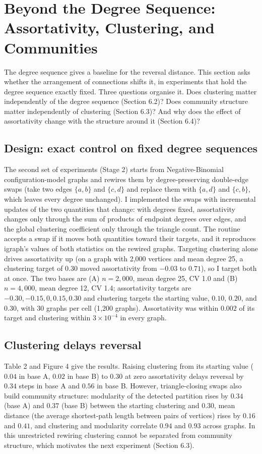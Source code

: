 \documentclass{nws}
\begin{document}
\section{Beyond the Degree Sequence: Assortativity, Clustering, and Communities}

The degree sequence gives a baseline for the reversal distance. This section asks whether the arrangement of connections shifts it, in experiments that hold the degree sequence exactly fixed. Three questions organise it. Does clustering matter independently of the degree sequence (Section 6.2)? Does community structure matter independently of clustering (Section 6.3)? And why does the effect of assortativity change with the structure around it (Section 6.4)?

\subsection{Design: exact control on fixed degree sequences}

The second set of experiments (Stage 2) starts from Negative-Binomial configuration-model graphs and rewires them
by degree-preserving double-edge swaps (take two edges $\{a,b\}$ and $\{c,d\}$ and replace them with $\{a,d\}$ and $\{c,b\}$, which leaves every degree unchanged). I implemented the swaps with incremental
updates of the two quantities that change: with degrees fixed, assortativity changes
only through the sum of products of endpoint degrees over edges, and the global
clustering coefficient only through the triangle count. The routine accepts a swap if
it moves both quantities toward their targets, and it reproduces igraph's values of
both statistics on the rewired graphs. Targeting clustering alone drives
assortativity up (on a graph with 2{,}000 vertices and mean degree 25, a clustering
target of 0.30 moved assortativity from $-0.03$ to $0.71$), so I target both at once.
The two bases are (A) $n=2{,}000$, mean degree 25, CV 1.0 and (B) $n=4{,}000$, mean
degree 12, CV 1.4; assortativity targets are $-0.30,-0.15,0,0.15,0.30$ and clustering
targets the starting value, $0.10$, $0.20$, and $0.30$, with 30 graphs per cell
(1{,}200 graphs). Assortativity was within $0.002$ of its target and clustering
within $3\times10^{-4}$ in every graph.

\subsection{Clustering delays reversal}

Table 2 and Figure 4 give the results. Raising clustering from its starting value ($0.04$ in base A, $0.02$ in base B) to $0.30$ at zero assortativity delays reversal by $0.34$ steps in base A and $0.56$ in
base B. However, triangle-closing swaps also build community structure: modularity of the
detected partition rises by $0.34$ (base A) and $0.37$ (base B) between the
starting clustering and 0.30, mean distance (the average shortest-path length between pairs of vertices) rises by $0.16$ and $0.41$, and
clustering and modularity correlate $0.94$ and $0.93$ across graphs. In this
unrestricted rewiring clustering cannot be separated from community structure,
which motivates the next experiment (Section 6.3).
\end{document}

